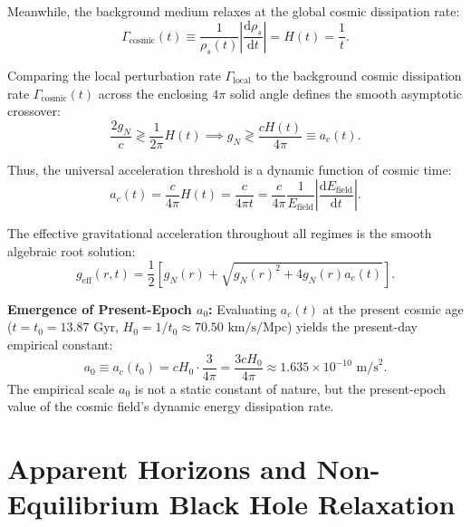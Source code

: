\documentclass[aps,prd,reprint,superscriptaddress,nofootinbib,floatfix,amsmath,amssymb]{revtex4-2}
\begin{document}
Meanwhile, the background medium relaxes at the global cosmic dissipation rate:
\begin{equation}
\Gamma_{\text{cosmic}}(t) \equiv \frac{1}{\rho_s(t)} \left| \frac{\mathrm{d}\rho_s}{\mathrm{d}t} \right| = H(t) = \frac{1}{t}.
\label{eq:cosmic_rate}
\end{equation}

Comparing the local perturbation rate $\Gamma_{\text{local}}$ to the background cosmic dissipation rate $\Gamma_{\text{cosmic}}(t)$ across the enclosing $4\pi$ solid angle defines the smooth asymptotic crossover:
\begin{equation}
\frac{2 g_N}{c} \gtrless \frac{1}{2\pi} H(t) \implies g_N \gtrless \frac{c H(t)}{4\pi} \equiv a_c(t).
\label{eq:crossover_condition}
\end{equation}

Thus, the universal acceleration threshold is a dynamic function of cosmic time:
\begin{equation}
a_c(t) = \frac{c}{4\pi} H(t) = \frac{c}{4\pi t} = \frac{c}{4\pi} \frac{1}{E_{\text{field}}} \left| \frac{\mathrm{d}E_{\text{field}}}{\mathrm{d}t} \right|.
\label{eq:ac_dynamic}
\end{equation}

The effective gravitational acceleration throughout all regimes is the smooth algebraic root solution:
\begin{equation}
g_{\text{eff}}(r, t) = \frac{1}{2} \left[ g_N(r) + \sqrt{g_N(r)^2 + 4 g_N(r) a_c(t)} \right].
\label{eq:root_gravity}
\end{equation}

\textbf{Emergence of Present-Epoch $a_0$:} Evaluating $a_c(t)$ at the present cosmic age ($t = t_0 = 13.87\text{ Gyr}$, $H_0 = 1/t_0 \approx 70.50\text{ km/s/Mpc}$) yields the present-day empirical constant:
\begin{equation}
a_0 \equiv a_c(t_0) = c H_0 \cdot \frac{3}{4\pi} = \frac{3 c H_0}{4\pi} \approx 1.635 \times 10^{-10}\text{ m/s}^2.
\label{eq:a0_evaluated}
\end{equation}
The empirical scale $a_0$ is not a static constant of nature, but the present-epoch value of the cosmic field's dynamic energy dissipation rate.

\section{Apparent Horizons and Non-Equilibrium Black Hole Relaxation}
\label{sec:horizons}
\end{document}
